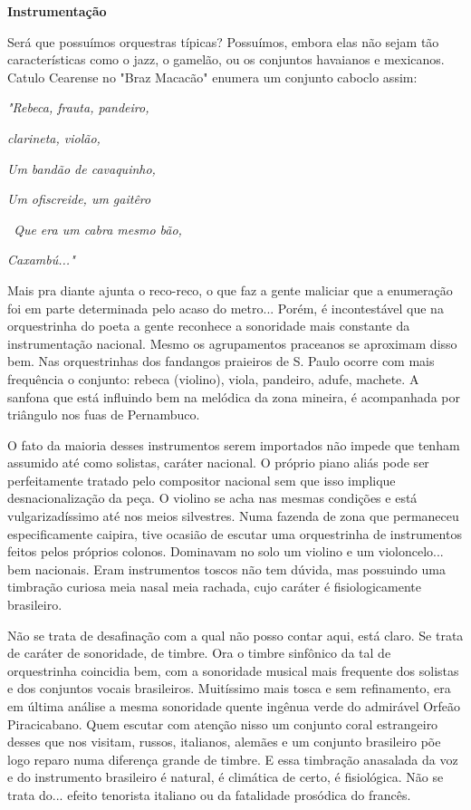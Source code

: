 \textbf{Instrumentação}

Será que possuímos orquestras típicas? Possuímos, embora elas não sejam
tão características como o jazz, o gamelão, ou os conjuntos havaianos e
mexicanos. Catulo Cearense no "Braz Macacão" enumera um conjunto caboclo
assim:~

\emph{"Rebeca, frauta, pandeiro,}

\emph{clarineta, violão,}

\emph{Um bandão de cavaquinho,}

\emph{Um ofiscreide, um gaitêro}

\emph{~Que era um cabra mesmo bão,}

\emph{Caxambú..."~}

Mais pra diante ajunta o reco-reco, o que faz a gente maliciar que a
enumeração foi em parte determinada pelo acaso do metro... Porém, é
incontestável que na orquestrinha do poeta a gente reconhece a
sonoridade mais constante da instrumentação nacional. Mesmo os
agrupamentos praceanos se aproximam disso bem. Nas orquestrinhas dos
fandangos praieiros de S. Paulo ocorre com mais frequência o conjunto:
rebeca (violino), viola, pandeiro, adufe, machete. A sanfona que está
influindo bem na melódica da zona mineira, é acompanhada por triângulo
nos fuas de Pernambuco.

O fato da maioria desses instrumentos serem importados não impede que
tenham assumido até como solistas, caráter nacional. O próprio piano
aliás pode ser perfeitamente tratado pelo compositor nacional sem que
isso implique desnacionalização da peça. O violino se acha nas mesmas
condições e está vulgarizadíssimo até nos meios silvestres. Numa fazenda
de zona que permaneceu especificamente caipira, tive ocasião de escutar
uma orquestrinha de instrumentos feitos pelos próprios colonos.
Dominavam no solo um violino e um violoncelo... bem nacionais. Eram
instrumentos toscos não tem dúvida, mas possuindo uma timbração curiosa
meia nasal meia rachada, cujo caráter é fisiologicamente brasileiro.

Não se trata de desafinação com a qual não posso contar aqui, está
claro. Se trata de caráter de sonoridade, de timbre. Ora o timbre
sinfônico da tal de orquestrinha coincidia bem, com a sonoridade musical
mais frequente dos solistas e dos conjuntos vocais brasileiros.
Muitíssimo mais tosca e sem refinamento, era em última análise a mesma
sonoridade quente ingênua verde do admirável Orfeão Piracicabano. Quem
escutar com atenção nisso um conjunto coral estrangeiro desses que nos
visitam, russos, italianos, alemães e um conjunto brasileiro põe logo
reparo numa diferença grande de timbre. E essa timbração anasalada da
voz e do instrumento brasileiro é natural, é climática de certo, é
fisiológica. Não se trata do... efeito tenorista italiano ou da
fatalidade prosódica do francês.~

